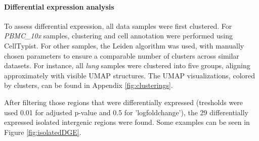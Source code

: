 \paragraph{Differential expression analysis}

To assess differential expression, all data samples were first clustered.
For \textit{PBMC\_10x} samples, clustering and cell annotation were performed using CellTypist.
For other samples, the Leiden algorithm was used, with manually chosen parameters to ensure a comparable number of clusters across similar datasets.
For instance, all \textit{lung} samples were clustered into five groups, aligning approximately with visible UMAP structures.
The UMAP visualizations, colored by clusters, can be found in Appendix \ref{fig:clusterings}.

After filtering those regions that were differentially expressed (tresholds were used 0.01 for adjusted p-value and 0.5 for 'logfoldchange'),
the 29 differentially expressed isolated intergenic regions were found.
Some examples can be seen in Figure \ref{fig:isolatedDGE}.

